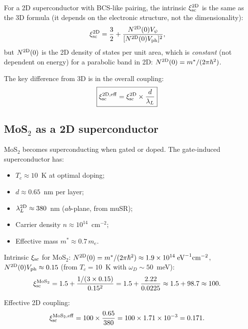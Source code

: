 \documentclass[11pt]{article}
\newcommand{\ee}[1]{\times 10^{#1}}
\begin{document}
For a 2D superconductor with BCS-like pairing, the intrinsic $\xi_{\rm sc}^{\rm 2D}$
is the same as the 3D formula (it depends on the electronic structure,
not the dimensionality):
\begin{equation}
\xi_{\rm sc}^{\rm 2D} = \frac{3}{2} + \frac{N^{\rm 2D}(0)V_\psi}{[N^{\rm 2D}(0)V_{\rm ph}]^2},
\label{eq:xi-sc-2D}
\end{equation}
but $N^{\rm 2D}(0)$ is the 2D density of states per unit area, which is
\emph{constant} (not dependent on energy) for a parabolic band in 2D:
$N^{\rm 2D}(0) = m^*/(2\pi\hbar^2)$.

The key difference from 3D is in the overall coupling:
\begin{equation}
\boxed{
\xi_{\rm sc}^{\rm 2D, eff} = \xi_{\rm sc}^{\rm 2D} \times \frac{d}{\lambda_L}
}
\label{eq:xi-2D-eff}
\end{equation}

\subsection{MoS$_2$ as a 2D superconductor}

MoS$_2$ becomes superconducting when gated or doped. The gate-induced
superconductor has:
\begin{itemize}
  \item $T_c \approx 10$~K at optimal doping;
  \item $d \approx 0.65$~nm per layer;
  \item $\lambda_L^{\rm 2D} \approx 380$~nm ($ab$-plane, from muSR);
  \item Carrier density $n \approx 10^{14}$~cm$^{-2}$;
  \item Effective mass $m^* \approx 0.7\,m_e$.
\end{itemize}

Intrinsic $\xi_{\rm sc}$ for MoS$_2$:
$N^{\rm 2D}(0) = m^*/(2\pi\hbar^2) \approx 1.9\ee{14}\;\text{eV}^{-1}\text{cm}^{-2}$,
$N^{\rm 2D}(0)V_{\rm ph} \approx 0.15$ (from $T_c = 10$~K with $\omega_D \sim 50$~meV):
\begin{equation}
\xi_{\rm sc}^{\rm MoS_2} = 1.5 + \frac{1/(3\times0.15)}{0.15^2} = 1.5 + \frac{2.22}{0.0225}
\approx 1.5 + 98.7 \approx 100.
\label{eq:xi-MoS2}
\end{equation}

Effective 2D coupling:
\begin{equation}
\xi_{\rm sc}^{\rm MoS_2, eff} = 100 \times \frac{0.65}{380} = 100 \times 1.71\ee{-3} = 0.171.
\label{eq:xi-MoS2-eff}
\end{equation}
\end{document}
